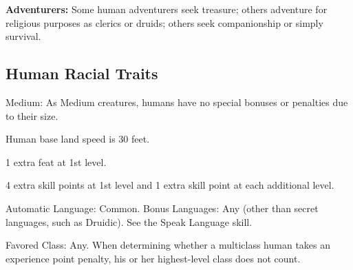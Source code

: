 \textbf{Adventurers:} Some human adventurers seek treasure; others adventure for religious purposes as clerics or druids; others seek companionship or simply survival.

\subsection{Human Racial Traits}
\begin{itemize*}
  \item Medium: As Medium creatures, humans have no special bonuses or penalties due to their size. 
  \item Human base land speed is 30 feet.
  \item 1 extra feat at 1st level.
  \item 4 extra skill points at 1st level and 1 extra skill point at each additional level.
  \item Automatic Language: Common. Bonus Languages: Any (other than secret languages, such as Druidic). See the Speak Language skill.
  \item Favored Class: Any. When determining whether a multiclass human takes an experience point penalty, his or her highest-level class does not count.
\end{itemize*}
